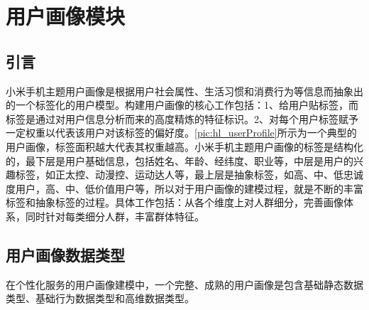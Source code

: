 
\chapter{用户画像模块}
\section{引言}
\label{chap:example}
\begin{figure}
\centering
  \label{pic:hl_userProfile}
\end{figure}
小米手机主题用户画像是根据用户社会属性、生活习惯和消费行为等信息而抽象出的一个标签化的用户模型。构建用户画像的核心工作包括：1、给用户贴标签，而标签是通过对用户信息分析而来的高度精炼的特征标识。2、对每个用户标签赋予一定权重以代表该用户对该标签的偏好度。\autoref{pic:hl_userProfile}所示为一个典型的用户画像，标签面积越大代表其权重越高。小米手机主题用户画像的标签是结构化的，最下层是用户基础信息，包括姓名、年龄、经纬度、职业等，中层是用户的兴趣标签，如正太控、动漫控、运动达人等，最上层是抽象标签，如高、中、低忠诚度用户，高、中、低价值用户等，所以对于用户画像的建模过程，就是不断的丰富标签和抽象标签的过程。具体工作包括：从各个维度上对人群细分，完善画像体系，同时针对每类细分人群，丰富群体特征。


\section{用户画像数据类型}
在个性化服务的用户画像建模中，一个完整、成熟的用户画像是包含基础静态数据类型、基础行为数据类型和高维数据类型。
